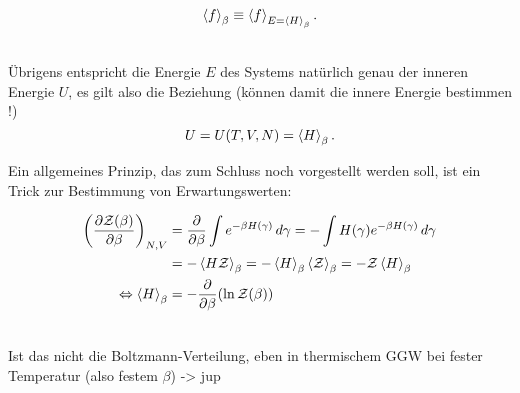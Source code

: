 \documentclass[../KlassMech_main.tex]{subfiles}
\begin{document}
\begin{equation}\label{key}
\expval{f}_\beta \equiv \expval{f}_{E = \expval{H}_\beta} .
\end{equation}


	\\

Übrigens entspricht die Energie $E$ des Systems natürlich genau der inneren Energie $U$, es gilt also die Beziehung (können damit die innere Energie bestimmen !)
\begin{equation}\label{key}
U = U(T, V, N) = \expval{H}_\beta .
\end{equation}

Ein allgemeines Prinzip, das zum Schluss noch vorgestellt werden soll, ist ein Trick zur Bestimmung von Erwartungswerten:

\begin{align}
\qty(\pdv{\mathcal{Z}(\beta)}{\beta})_{N,V} &= \pdv{\beta} \int e^{-\beta H(\gamma)} \, d\gamma = - \int H(\gamma) e^{-\beta H(\gamma)} \, d\gamma
\notag\\
&= - \expval{H \mathcal{Z}}_\beta = - \expval{H}_\beta \expval{\mathcal{Z}}_\beta = - \mathcal{Z} \expval{H}_\beta
\notag\\
\Leftrightarrow \expval{H}_\beta &= -\pdv{\beta}\qty(\ln \mathcal{Z}(\beta)) \label{eq:evalH}
\end{align}

	\\


Ist das nicht die Boltzmann-Verteilung, eben in thermischem GGW bei fester Temperatur (also festem $\beta$) -> jup
\end{document}
